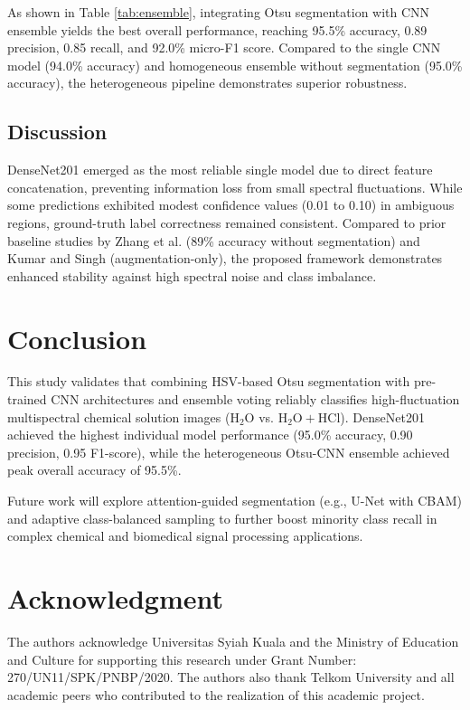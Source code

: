 \documentclass[conference]{IEEEtran}
\begin{document}
As shown in Table \ref{tab:ensemble}, integrating Otsu segmentation with CNN ensemble yields the best overall performance, reaching 95.5\% accuracy, 0.89 precision, 0.85 recall, and 92.0\% micro-F1 score. Compared to the single CNN model (94.0\% accuracy) and homogeneous ensemble without segmentation (95.0\% accuracy), the heterogeneous pipeline demonstrates superior robustness.

\subsection{Discussion}
DenseNet201 emerged as the most reliable single model due to direct feature concatenation, preventing information loss from small spectral fluctuations. While some predictions exhibited modest confidence values (0.01 to 0.10) in ambiguous regions, ground-truth label correctness remained consistent. Compared to prior baseline studies by Zhang et al. \cite{ref25} (89\% accuracy without segmentation) and Kumar and Singh \cite{ref26} (augmentation-only), the proposed framework demonstrates enhanced stability against high spectral noise and class imbalance.

\section{Conclusion}
This study validates that combining HSV-based Otsu segmentation with pre-trained CNN architectures and ensemble voting reliably classifies high-fluctuation multispectral chemical solution images ($\text{H}_2\text{O}$ vs. $\text{H}_2\text{O} + \text{HCl}$). DenseNet201 achieved the highest individual model performance (95.0\% accuracy, 0.90 precision, 0.95 F1-score), while the heterogeneous Otsu-CNN ensemble achieved peak overall accuracy of 95.5\%.

Future work will explore attention-guided segmentation (e.g., U-Net with CBAM) and adaptive class-balanced sampling to further boost minority class recall in complex chemical and biomedical signal processing applications.

\section*{Acknowledgment}
The authors acknowledge Universitas Syiah Kuala and the Ministry of Education and Culture for supporting this research under Grant Number: 270/UN11/SPK/PNBP/2020. The authors also thank Telkom University and all academic peers who contributed to the realization of this academic project.
\end{document}
